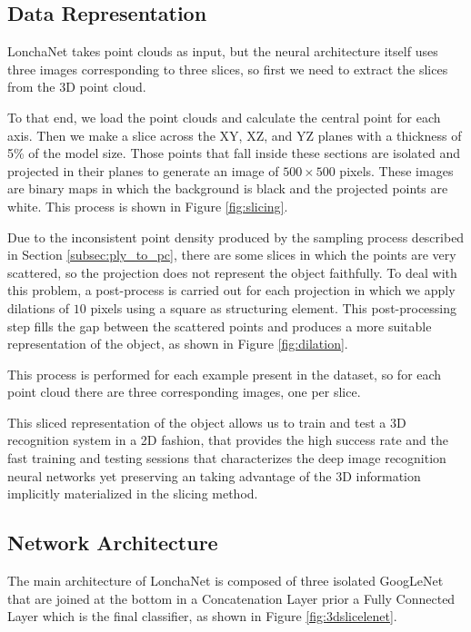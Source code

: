 \subsection{Data Representation}
\label{cha:objrecog:sec:lonchanet:subsec:representation}

LonchaNet takes point clouds as input, but the neural architecture itself uses three images corresponding to three slices, so first we need to extract the slices from the 3D point cloud.

To that end, we load the point clouds and calculate the central point for each axis. Then we make a slice across the XY, XZ, and YZ planes with a thickness of 5\% of the model size. Those points that fall inside these sections are isolated and projected in their planes to generate an image of $500 \times 500$ pixels. These images are binary maps in which the background is black and the projected points are white. This process is shown in Figure \ref{fig:slicing}.

Due to the inconsistent point density produced by the sampling process described in Section \ref{subsec:ply_to_pc}, there are some slices in which the points are very scattered, so the projection does not represent the object faithfully. To deal with this problem, a post-process is carried out for each projection in which we apply dilations of $10$ pixels using a square as structuring element. This post-processing step fills the gap between the scattered points and produces a more suitable representation of the object, as shown in Figure \ref{fig:dilation}.

This process is performed for each example present in the dataset, so for each point cloud there are three corresponding images, one per slice.

This sliced representation of the object allows us to train and test a 3D recognition system in a 2D fashion, that provides the high success rate and the fast training and testing sessions that characterizes the deep image recognition neural networks yet preserving an taking advantage of the 3D information implicitly materialized in the slicing method.

\subsection{Network Architecture}
\label{cha:objrecog:sec:lonchanet:subsec:architecture}

The main architecture of LonchaNet is composed of three isolated GoogLeNet that are joined at the bottom in a Concatenation Layer prior a Fully Connected Layer which is the final classifier, as shown in Figure \ref{fig:3dslicelenet}.

